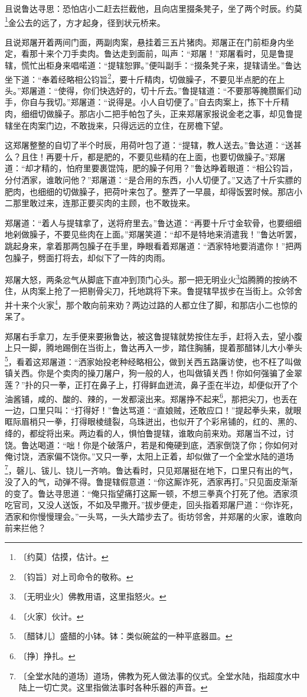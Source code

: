 \documentclass[12pt,UTF-8,openany]{ctexbook}
\begin{document}
\begin{normalsize}
    且说鲁达寻思：恐怕店小二赶去拦截他，且向店里掇条凳子，坐了两个时辰。约莫\footnote{〔约莫〕估摸，估计。}金公去的远了，方才起身，径到状元桥来。
    
    且说郑屠开着两间门面，两副肉案，悬挂着三五片猪肉。郑屠正在门前柜身内坐定，看那十来个刀手卖肉。鲁达走到面前，叫声：“郑屠！”郑屠看时，见是鲁提辖，慌忙出柜身来唱喏道：“提辖恕罪。”便叫副手：“掇条凳子来，提辖请坐。”鲁达坐下道：“奉着经略相公钧旨\footnote{〔钧旨〕对上司命令的敬称。}，要十斤精肉，切做臊子，不要见半点肥的在上头。”郑屠道：“使得，你们快选好的，切十斤去。”鲁提辖道：“不要那等腌臜厮们动手，你自与我切。”郑屠道：“说得是。小人自切便了。”自去肉案上，拣下十斤精肉，细细切做臊子。那店小二把手帕包了头，正来郑屠家报说金老之事，却见鲁提辖坐在肉案门边，不敢拢来，只得远远的立住，在房檐下望。
    
    这郑屠整整的自切了半个时辰，用荷叶包了道：“提辖，教人送去。”鲁达道：“送甚么？且住！再要十斤，都是肥的，不要见些精的在上面，也要切做臊子。”郑屠道：“却才精的，怕府里要裹馄饨，肥的臊子何用？”鲁达睁着眼道：“相公钧旨，分付洒家，谁敢问他？”郑屠道：“是合用的东西，小人切便了。”又选了十斤实膘的肥肉，也细细的切做臊子，把荷叶来包了。整弄了一早晨，却得饭罢时候。那店小二那里敢过来，连那正要买肉的主顾，也不敢拢来。
    
    郑屠道：“着人与提辖拿了，送将府里去。”鲁达道：“再要十斤寸金软骨，也要细细地剁做臊子，不要见些肉在上面。”郑屠笑道：“却不是特地来消遣我！”鲁达听罢，跳起身来，拿着那两包臊子在手里，睁眼看着郑屠道：“洒家特地要消遣你！”把两包臊子，劈面打将去，却似下了一阵的肉雨。
    
    郑屠大怒，两条忿气从脚底下直冲到顶门心头。那一把无明业火\footnote{〔无明业火〕佛教用语，这里指怒火。}焰腾腾的按纳不住，从肉案上抢了一把剔骨尖刀，托地跳将下来。鲁提辖早拔步在当街上。众邻舍并十来个火家\footnote{〔火家〕伙计。}，那个敢向前来劝？两边过路的人都立住了脚，和那店小二也惊的呆了。
    
    郑屠右手拿刀，左手便来要揪鲁达，被这鲁提辖就势按住左手，赶将入去，望小腹上只一脚，腾地踢倒在当街上，鲁达再入一步，踏住胸脯，提着那醋钵儿大小拳头\footnote{〔醋钵儿〕盛醋的小钵。钵：类似碗盆的一种平底器皿。}，看着这郑屠道：“洒家始投老种经略相公，做到关西五路廉访使，也不枉了叫做镇关西。你是个卖肉的操刀屠户，狗一般的人，也叫做镇关西！你如何强骗了金翠莲？”扑的只一拳，正打在鼻子上，打得鲜血迸流，鼻子歪在半边，却便似开了个油酱铺，咸的、酸的、辣的，一发都滚出来。郑屠挣不起来\footnote{〔挣〕挣扎。}，那把尖刀，也丢在一边，口里只叫：“打得好！”鲁达骂道：“直娘贼，还敢应口！”提起拳头来，就眼眶际眉梢只一拳，打得眼棱缝裂，乌珠迸出，也似开了个彩帛铺的，红的、黑的、绛的，都绽将出来。两边看的人，惧怕鲁提辖，谁敢向前来劝。郑屠当不过，讨饶。鲁达喝道：“咄！你是个破落户，若是和俺硬到底，洒家倒饶了你；你如何对俺讨饶，洒家偏不饶你。”又只一拳，太阳上正着，却似做了一个全堂水陆的道场\footnote{〔全堂水陆的道场〕道场，佛教为死人做法事的仪式。全堂水陆，指超度水中陆上一切亡灵。这里指做法事时各种乐器的声音。}，磬儿、钹儿、铙儿一齐响。鲁达看时，只见郑屠挺在地下，口里只有出的气，没了入的气，动弹不得。鲁提辖假意道：“你这厮诈死，洒家再打。”只见面皮渐渐的变了。鲁达寻思道：“俺只指望痛打这厮一顿，不想三拳真个打死了他。洒家须吃官司，又没人送饭，不如及早撒开。”拔步便走，回头指着郑屠尸道：“你诈死，洒家和你慢慢理会。”一头骂，一头大踏步去了。街坊邻舍，并郑屠的火家，谁敢向前来拦他？
    

\end{normalsize}
\end{document}
